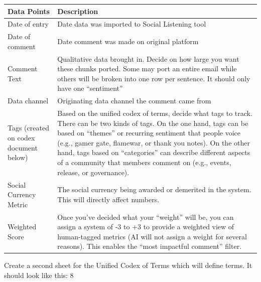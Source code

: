 \begin{longtable}[]{@{}ll@{}}
\toprule
Data Points & Description \\
\midrule
\endhead
Date of entry & Date data was imported to Social Listening tool \\
Date of comment & Date comment was made on original platform \\
Comment Text & Qualitative data brought in. Decide on how large you want
these chunks ported. Some may port an entire email while others will be
broken into one row per sentence. It should only have one
``sentiment'' \\
Data channel & Originating data channel the comment came from \\
Tags (created on codex document below) & Based on the unified codex of
terms, decide what tags to track. There can be two kinds of tags. On the
one hand, tags can be based on ``themes'' or recurring sentiment that
people voice (e.g., gamer gate, flamewar, or thank you notes). On the
other hand, tags based on ``categories'' can describe different aspects
of a community that members comment on (e.g., events, release, or
governance). \\
Social Currency Metric & The social currency being awarded or demerited
in the system. This will directly affect numbers. \\
Weighted Score & Once you've decided what your ``weight'' will be, you
can assign a system of -3 to +3 to provide a weighted view of
human-tagged metrics (AI will not assign a weight for several reasons).
This enables the ``most impactful comment'' filter. \\
\bottomrule
\end{longtable}

Create a second sheet for the Unified Codex of Terms which will define
terms. It should look like this: 8


